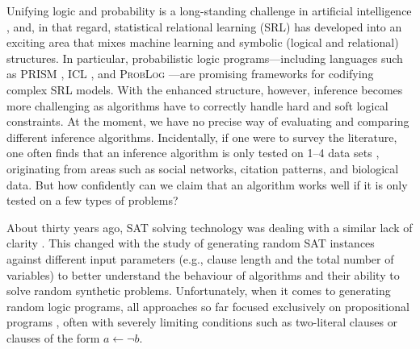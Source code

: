 \documentclass[runningheads]{llncs}
\begin{document}
Unifying logic and probability is a long-standing challenge in artificial
intelligence \cite{DBLP:journals/cacm/Russell15}, and, in that regard,
statistical relational learning (SRL) has developed into an exciting area that
mixes machine learning and symbolic (logical and relational) structures. In
particular, probabilistic logic programs---including languages such as
\textsc{PRISM} \cite{DBLP:conf/ijcai/SatoK97}, \textsc{ICL}
\cite{DBLP:journals/ai/Poole97}, and \textsc{ProbLog}
\cite{DBLP:conf/ijcai/RaedtKT07}---are promising frameworks for codifying
complex SRL models. With the enhanced structure, however, inference becomes more
challenging as algorithms have to correctly handle hard and soft logical
constraints. At the moment, we have no precise way of evaluating and comparing
different inference algorithms. Incidentally, if one were to survey the
literature, one often finds that an inference algorithm is only tested on 1--4
data sets
\cite{DBLP:conf/ecai/BruynoogheMKGVJR10,DBLP:journals/tplp/KimmigDRCR11,DBLP:conf/ijcai/VlasselaerBKMR15},
originating from areas such as social networks, citation patterns, and
biological data. But how confidently can we claim that an algorithm works well
if it is only tested on a few types of problems?

About thirty years ago, SAT solving technology was dealing with a similar lack
of clarity \cite{DBLP:journals/ai/SelmanML96}. This changed with the study of
generating random SAT instances against different input parameters (e.g.,
clause length and the total number of variables) to better understand the
behaviour of algorithms and their ability to solve random synthetic problems.
Unfortunately, when it comes to generating random logic programs, all approaches
so far focused exclusively on propositional programs
\cite{DBLP:conf/ijcai/AmendolaRT17,DBLP:journals/ai/AmendolaRT20,DBLP:journals/tplp/WangWM15,DBLP:conf/iclp/ZhaoL03},
often with severely limiting conditions such as two-literal clauses
\cite{DBLP:conf/iclp/Namasivayam09,DBLP:conf/lpnmr/NamasivayamT09} or clauses of
the form $a \gets \neg b$.
\end{document}
